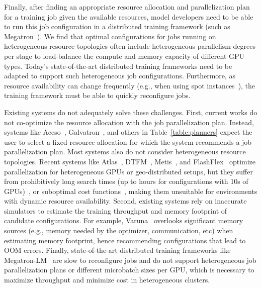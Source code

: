 Finally, after finding an appropriate resource allocation and parallelization plan for a training job given the available resources, model developers need to be able to run this job configuration in a distributed training framework (such as Megatron~\cite{shoeybi2020megatronlm}). We find that optimal configurations for jobs running on heterogeneous resource topologies often include heterogeneous parallelism degrees per stage to load-balance the compute and memory capacity of different GPU types. 
Today's state-of-the-art distributed training frameworks need to be adapted to support such heterogeneous job configurations. Furthermore, as resource availability can change frequently (e.g., when using spot instances~\cite{Thorpe23Bamboo}), the training framework must be able to quickly reconfigure jobs.


Existing systems do not adequately solve these challenges. First,   
current works do not co-optimize the resource allocation with the job parallelization plan. Instead, systems like Aceso~\cite{Liu24Aceso}, Galvatron~\cite{Miao22Galvatron}, and others in Table~\ref{table:planners} expect the user to select a fixed resource allocation for which the system recommends a job parallelization plan. Most systems also do not consider heterogeneous resource topologies. 
Recent systems like Atlas~\cite{palak2024atlas}, DTFM~\cite{yuan2023decentralized}, Metis~\cite{Um24Metis}, and FlashFlex~\cite{yan2024flashflex} optimize parallelization for heterogeneous GPUs or geo-distributed setups, but they suffer from prohibitively long search times (up to hours for configurations with 10s of GPUs)~\cite{Um24Metis}, or suboptimal cost functions~\cite{yan2024flashflex, yuan2023decentralized}, making them unsuitable for environments with dynamic resource availability. 
Second, existing systems rely on inaccurate simulators to estimate the training throughput and memory footprint of candidate configurations. For example, Varuna~\cite{Athlur22Varuna} overlooks significant memory sources (e.g., memory needed by the optimizer, communication, etc) when estimating memory footprint, hence recommending configurations that lead to OOM errors. Finally, state-of-the-art distributed training frameworks like Megatron-LM~\cite{shoeybi2020megatronlm} are slow to reconfigure jobs and do not support heterogeneous job parallelization plans or different microbatch sizes per GPU, which is necessary to maximize throughput and minimize cost in heterogeneous clusters.

